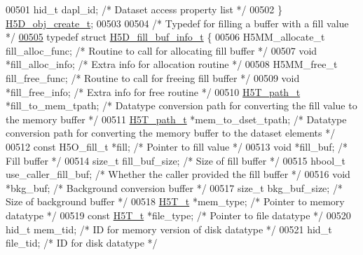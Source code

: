 \begin{DoxyCode}
00501     hid\_t dapl\_id;              \textcolor{comment}{/* Dataset access property list */}
00502 \} \hyperlink{struct_h5_d__obj__create__t}{H5D\_obj\_create\_t};
00503 
00504 \textcolor{comment}{/* Typedef for filling a buffer with a fill value */}
\hyperlink{struct_h5_d__fill__buf__info__t}{00505} \textcolor{keyword}{typedef} \textcolor{keyword}{struct }\hyperlink{struct_h5_d__fill__buf__info__t}{H5D\_fill\_buf\_info\_t} \{
00506     H5MM\_allocate\_t fill\_alloc\_func;    \textcolor{comment}{/* Routine to call for allocating fill buffer */}
00507     \textcolor{keywordtype}{void}        *fill\_alloc\_info;       \textcolor{comment}{/* Extra info for allocation routine */}
00508     H5MM\_free\_t fill\_free\_func;         \textcolor{comment}{/* Routine to call for freeing fill buffer */}
00509     \textcolor{keywordtype}{void}        *fill\_free\_info;        \textcolor{comment}{/* Extra info for free routine */}
00510     \hyperlink{struct_h5_t__path__t}{H5T\_path\_t} *fill\_to\_mem\_tpath;      \textcolor{comment}{/* Datatype conversion path for converting the fill value
       to the memory buffer */}
00511     \hyperlink{struct_h5_t__path__t}{H5T\_path\_t} *mem\_to\_dset\_tpath;      \textcolor{comment}{/* Datatype conversion path for converting the memory
       buffer to the dataset elements */}
00512     \textcolor{keyword}{const} H5O\_fill\_t *fill;             \textcolor{comment}{/* Pointer to fill value */}
00513     \textcolor{keywordtype}{void}       *fill\_buf;               \textcolor{comment}{/* Fill buffer */}
00514     \textcolor{keywordtype}{size\_t}      fill\_buf\_size;          \textcolor{comment}{/* Size of fill buffer */}
00515     hbool\_t     use\_caller\_fill\_buf;    \textcolor{comment}{/* Whether the caller provided the fill buffer */}
00516     \textcolor{keywordtype}{void}       *bkg\_buf;                \textcolor{comment}{/* Background conversion buffer */}
00517     \textcolor{keywordtype}{size\_t}      bkg\_buf\_size;           \textcolor{comment}{/* Size of background buffer */}
00518     \hyperlink{struct_h5_t__t}{H5T\_t}      *mem\_type;               \textcolor{comment}{/* Pointer to memory datatype */}
00519     \textcolor{keyword}{const} \hyperlink{struct_h5_t__t}{H5T\_t} *file\_type;             \textcolor{comment}{/* Pointer to file datatype */}
00520     hid\_t       mem\_tid;                \textcolor{comment}{/* ID for memory version of disk datatype */}
00521     hid\_t       file\_tid;               \textcolor{comment}{/* ID for disk datatype */}

\end{DoxyCode}
